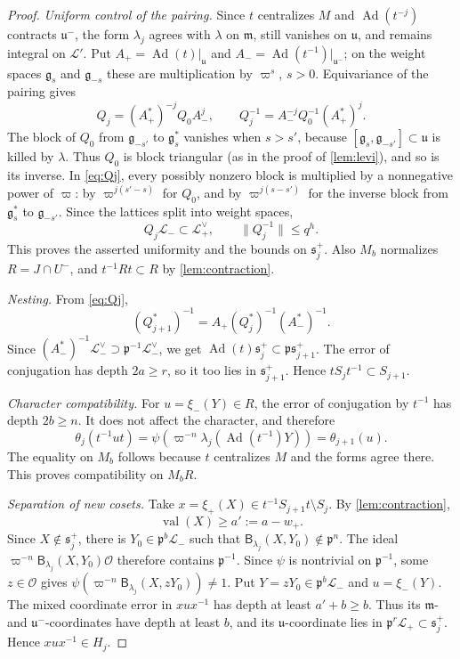 \documentclass[11pt,reqno]{amsart}
\numberwithin{equation}{section}
\theoremstyle{plain}
\theoremstyle{definition}
\theoremstyle{remark}
\theoremstyle{plain}
\newcommand{\OO}{\mathcal{O}}    %
\newcommand{\pp}{\mathfrak{p}}   %
\newcommand{\Lat}{\mathcal{L}}   %
\newcommand{\g}{\mathfrak{g}}    %
\newcommand{\uu}{\mathfrak{u}}   %
\newcommand{\m}{\mathfrak{m}}    %
\newcommand{\sS}{\mathfrak{s}^+}   %
\newcommand{\norm}[1]{\lVert#1\rVert}
\DeclareMathOperator{\Ad}{Ad}
\DeclareMathOperator{\val}{val}
\newcommand{\lf}{\lambda}
\newcommand{\Bf}{\mathsf{B}}
\begin{document}
\begin{proof}
\emph{Uniform control of the pairing.}
Since $t$ centralizes $M$ and $\Ad(t^{-j})$ contracts $\uu^-$,
the form $\lf_j$ agrees with $\lf$ on $\m$, still vanishes on
$\uu$, and remains integral on $\Lat'$. Put
$A_+=\Ad(t)|_{\uu}$ and $A_-=\Ad(t^{-1})|_{\uu^-}$; on the
weight spaces $\g_s$ and $\g_{-s}$ these are multiplication by
$\varpi^s$, $s>0$. Equivariance of the pairing gives
\begin{equation}\label{eq:Qj}
Q_j=(A_+^*)^{-j}Q_0A_-^j,\qquad
Q_j^{-1}=A_-^{-j}Q_0^{-1}(A_+^*)^j.
\end{equation}
The block of $Q_0$ from $\g_{-s'}$ to $\g_s^*$ vanishes when
$s>s'$, because $[\g_s,\g_{-s'}]\subset\uu$ is killed by $\lf$.
Thus $Q_0$ is block triangular (as in the proof of \cref{lem:levi}), and
so is its inverse. In \eqref{eq:Qj}, every possibly nonzero block is
multiplied by a nonnegative power of $\varpi$: by $\varpi^{j(s'-s)}$ for
$Q_0$, and by $\varpi^{j(s-s')}$ for the inverse block from
$\g_s^*$ to $\g_{-s'}$. Since the lattices split into weight spaces,
\[
Q_j\Lat_-\subset\Lat_+^\vee,\qquad
\norm{Q_j^{-1}}\le q^h.
\]
This proves the asserted uniformity and the bounds on $\sS_j$.
Also $M_b$ normalizes $R=J\cap U^-$, and
$t^{-1}Rt\subset R$ by \cref{lem:contraction}.

\smallskip\noindent\emph{Nesting.}
From \eqref{eq:Qj},
\[
(Q_{j+1}^*)^{-1}
=A_+(Q_j^*)^{-1}(A_-^*)^{-1}.
\]
Since $(A_-^*)^{-1}\Lat_-^\vee\supset\pp^{-1}\Lat_-^\vee$,
we get $\Ad(t)\sS_j\subset\pp\sS_{j+1}$.
The error of conjugation has depth $2a\ge r$, so it too lies in
$\sS_{j+1}$. Hence $tS_jt^{-1}\subset S_{j+1}$.

\smallskip\noindent\emph{Character compatibility.}
For $u=\xi_-(Y)\in R$, the error of conjugation by $t^{-1}$ has
depth $2b\ge n$. It does not affect the character, and therefore
\[
\theta_j(t^{-1}ut)
=\psi(\varpi^{-n}\lf_j(\Ad(t^{-1})Y))
=\theta_{j+1}(u).
\]
The equality on $M_b$ follows because $t$ centralizes $M$ and the
forms agree there. This proves compatibility on $M_bR$.

\smallskip\noindent\emph{Separation of new cosets.}
Take $x=\xi_+(X)\in t^{-1}S_{j+1}t\setminus S_j$.
By \cref{lem:contraction},
\[
\val(X)\ge a':=a-w_+.
\]
Since $X\notin\sS_j$, there is $Y_0\in\pp^b\Lat_-$ such that
$\Bf_{\lf_j}(X,Y_0)\notin\pp^n$. The ideal
$\varpi^{-n}\Bf_{\lf_j}(X,Y_0)\OO$ therefore contains $\pp^{-1}$.
Since $\psi$ is nontrivial on $\pp^{-1}$, some $z\in\OO$ gives
$\psi(\varpi^{-n}\Bf_{\lf_j}(X,zY_0))\ne1$.
Put $Y=zY_0\in\pp^b\Lat_-$ and $u=\xi_-(Y)$.
The mixed coordinate error in $xux^{-1}$ has depth at least
$a'+b\ge b$. Thus its $\m$- and $\uu^-$-coordinates have depth
at least $b$, and its $\uu$-coordinate lies in
$\pp^r\Lat_+\subset\sS_j$. Hence $xux^{-1}\in H_j$.


\end{proof}
\end{document}
